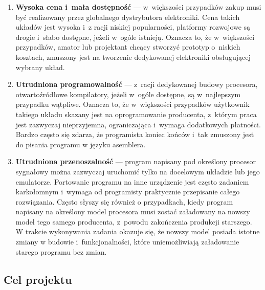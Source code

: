 \begin{enumerate}

    \item \textbf{Wysoka cena i~mała dostępność} --- w~większości przypadków
    zakup musi być realizowany przez globalnego dystrybutora elektroniki. Cena
    takich układów jest wysoka i~z racji niskiej popularności, platformy
    rozwojowe są drogie i~słabo dostępne, jeżeli w~ogóle istnieją. Oznacza to,
    że w~większości przypadków, amator lub projektant chcący stworzyć prototyp
    o~niskich kosztach, zmuszony jest na tworzenie dedykowanej elektroniki
    obsługującej wybrany układ.

    \item \textbf{Utrudniona programowalność} --- z~racji dedykowanej budowy
    procesora, otwartoźródłowe kompilatory, jeżeli w~ogóle dostępne, są
    w~najlepszym przypadku wątpliwe. Oznacza to, że w~większości przypadków
    użytkownik takiego układu skazany jest na oprogramowanie producenta,
    z~którym praca jest zazwyczaj nieprzyjemna, ograniczająca i~wymaga
    dodatkowych płatności. Bardzo często się zdarza, że programista koniec
    końców i~tak zmuszony jest do pisania programu w języku asemblera.

    \item \textbf{Utrudniona przenoszalność} --- program napisany pod określony
    procesor sygnałowy można zazwyczaj uruchomić tylko na docelowym układzie lub
    jego emulatorze. Portowanie programu na inne urządzenie jest często zadaniem
    karkołomnym i~wymaga od programisty praktycznie przepisanie całego
    rozwiązania. Często słyszy się również o przypadkach, kiedy program napisany
    na określony model procesora musi zostać załadowany na nowszy model tego
    samego producenta, z~powodu zakończenia produkcji starszego. W trakcie
    wykonywania zadania okazuje się, że nowszy model posiada istotne zmiany w
    budowie i~funkcjonalności, które uniemożliwiają załadowanie starego programu
    bez zmian.

\end{enumerate}

\subsection{Cel projektu}

